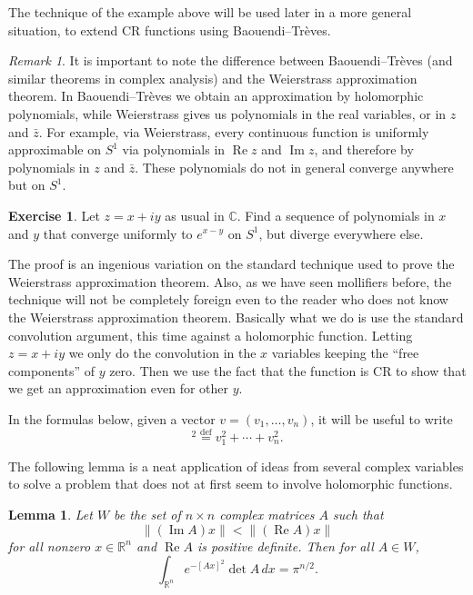 \documentclass[12pt,openany]{book}
\renewcommand{\Re}{\operatorname{Re}}
\renewcommand{\Im}{\operatorname{Im}}
\newcommand{\snorm}[1]{\lVert {#1} \rVert}
\newcommand{\C}{{\mathbb{C}}}
\newcommand{\R}{{\mathbb{R}}}
\theoremstyle{plain}
\newtheorem{lemma}[thm]{Lemma}
\theoremstyle{remark}
\newtheorem{remark}[thm]{Remark}
\theoremstyle{definition}
\newenvironment{exbox}{%
    \def\FrameCommand{\vrule width 1pt \relax\hspace{10pt}}%
    \MakeFramed{\advance\hsize-\width\FrameRestore}%
}{%
    \endMakeFramed
}
\theoremstyle{exercise}
\newtheorem{exercise}{Exercise}[section]
\theoremstyle{example}
\begin{document}
The technique of the example above will be used later in a more general
situation, to extend CR functions using Baouendi--Tr{\`e}ves.

\begin{remark}
It is important to note the difference
between Baouendi--Tr{\`e}ves (and similar theorems
in complex analysis)
and the Weierstrass approximation theorem.  In Baouendi--Tr{\`e}ves we obtain
an approximation by holomorphic polynomials, while Weierstrass gives us
polynomials in the real variables, or in $z$ and $\bar{z}$.  For example,
via Weierstrass, every continuous function is uniformly approximable on $S^1$ via polynomials
in $\Re z$ and $\Im z$, and therefore by polynomials in $z$ and $\bar{z}$.
These polynomials do not in general converge anywhere but on $S^1$.
\end{remark}

\begin{exbox}
\begin{exercise}
Let $z=x+iy$ as usual in $\C$.
Find a sequence of polynomials in $x$ and $y$ that converge uniformly to $e^{x-y}$ on $S^1$,
but diverge everywhere else.
\end{exercise}
\end{exbox}


The proof is an ingenious
variation on the standard technique used to prove the Weierstrass approximation
theorem.  Also, as we have seen mollifiers before, the technique will not be
completely foreign even to the reader who does not know the Weierstrass
approximation theorem.  Basically what we do is use the standard convolution
argument, this time against a holomorphic function.  Letting $z=x+iy$
we only do the convolution in the
$x$ variables keeping the ``free components'' of $y$ zero.
Then we use the fact that the
function is CR to show that we get an approximation even for other $y$.

In the formulas below, given a vector $v = (v_1,\ldots,v_n)$,
it will be useful to write
%
\begin{equation*}
[v]^2 \overset{\text{def}}{=} v_1^2 + \cdots + v_n^2 .
\end{equation*}

The following lemma is a neat application of ideas from several complex
variables to solve a problem that does not at first seem to involve
holomorphic functions.

\begin{lemma} \label{lemma:matrixint}
Let $W$ be the set of $n \times n$ complex matrices $A$ such that
\begin{equation*}
\snorm{(\Im A)x} < \snorm{(\Re A)x}
\end{equation*}
for all nonzero $x \in \R^n$ and $\Re A$ is positive definite.
Then for all $A \in W$,
\begin{equation*}
\int_{\R^n} e^{-{[Ax]}^2} \det A \, dx  = \pi^{n/2} .
\end{equation*}
\end{lemma}
\end{document}
